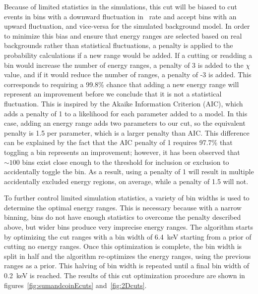 \documentclass[/main.tex]{subfiles}
\begin{document}
Because of limited statistics in the simulations, this cut will be biased to cut events in bins with a downward fluctuation in \bbes\ rate and accept bins with an upward fluctuation, and vice-versa for the simulated background model.
In order to minimize this bias and ensure that energy ranges are selected based on real backgrounds rather than statistical fluctuations, a penalty is applied to the probability calculations if a new range would be added.
If a cutting or readding a bin would increase the number of energy ranges, a penalty of 3 is added to the $\chi$ value, and if it would reduce the number of ranges, a penalty of -3 is added.
This corresponds to requiring a 99.8\% chance that adding a new energy range will represent an improvement before we conclude that it is not a statistical fluctuation.
This is inspired by the Akaike Information Criterion (AIC)\cite{Akaike1974}, which adds a penalty of 1 to a likelihood for each parameter added to a model.
In this case, adding an energy range adds two parameters to our cut, so the equivalent penalty is 1.5 per parameter, which is a larger penalty than AIC.
This difference can be explained by the fact that the AIC penalty of 1 requires 97.7\% that toggling a bin represents an improvement; however, it has been observed that ${\sim}100$ bins exist close enough to the threshold for inclusion or exclusion to accidentally toggle the bin.
As a result, using a penalty of 1 will result in multiple accidentally excluded energy regions, on average, while a penalty of 1.5 will not.

To further control limited simulation statistics, a variety of bin widths is used to determine the optimal energy ranges.
This is necessary because with a narrow binning, bins do not have enough statistics to overcome the penalty described above, but wider bins produce very imprecise energy ranges.
The algorithm starts by optimizing the cut ranges with a bin width of 6.4~keV starting from a prior of cutting no energy ranges.
Once this optimization is complete, the bin width is split in half and the algorithm re-optimizes the energy ranges, using the previous ranges as a prior.
This halving of bin width is repeated until a final bin width of 0.2~keV is reached.
The results of this cut optimization procedure are shown in figures~\ref{fig:sumandcoinEcuts} and~\ref{fig:2Dcuts}.
\end{document}
